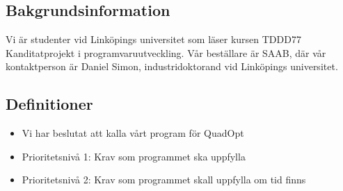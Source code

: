 \subsection{Bakgrundsinformation}
Vi är studenter vid Linköpings universitet som läser kursen TDDD77 Kanditatprojekt i programvaruutveckling. Vår beställare är SAAB, där vår kontaktperson är Daniel Simon, industridoktorand vid Linköpings universitet. 

\subsection{Definitioner}

\begin{itemize}
\item{Vi har beslutat att kalla vårt program för QuadOpt}
\item{Prioritetsnivå 1: Krav som programmet ska uppfylla}
\item{Prioritetsnivå 2: Krav som programmet skall uppfylla om tid finns}
\end{itemize}
